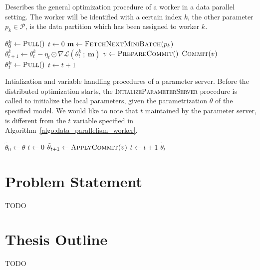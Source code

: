 \begin{algorithm}[H]
  \caption{Describes the general optimization procedure of a worker in a data parallel setting. The worker will be identified with a certain index $k$, the other parameter $p_k \in \mathcal{P}$, is the data partition which has been assigned to worker $k$.}
  \label{algo:data_parallelism_worker}
  \begin{algorithmic}[1]
    \State $\theta^k_0 \gets \Call{Pull}{ }$
    \State $t \gets 0$
    \State $\textbf{m} \gets \Call{FetchNextMiniBatch}{p_k}$
    \State $\theta^k_{t + 1} \gets \theta^k_t - \eta_t \odot \nabla \mathcal{L}(\theta^k_t~;~\textbf{m})$ 
    \State $v \gets \Call{PrepareCommit}{ }$
    \State $\Call{Commit}{v}$
    \State $\theta^k_t \gets \Call{Pull}{ }$
    \State $t \gets t + 1$
    \EndWhile
    \EndProcedure
  \end{algorithmic}
\end{algorithm}

\begin{algorithm}[H]
  \caption{Intialization and variable handling procedures of a parameter server. Before the distributed optimization starts, the \textsc{IntializeParameterServer} procedure is called to initialize the local parameters, given the parametrization $\theta$ of the specified model. We would like to note that $t$ maintained by the parameter server, is different from the $t$ variable specified in Algorithm~\ref{algo:data_parallelism_worker}.}
  \label{algo:data_parallelism_parameter_server}
  \begin{algorithmic}[1]
    \State $\tilde{\theta}_0 \gets \theta$
    \State $t \gets 0$
    \EndProcedure
    \State
    \State $\tilde{\theta}_{t + 1} \gets \Call{ApplyCommit}{v}$
    \State $t \gets t + 1$
    \EndProcedure
    \State
    \State \Return $\tilde{\theta}_t$
    \EndProcedure
  \end{algorithmic}
\end{algorithm}

\section{Problem Statement}
\label{sec:problem_statement}

TODO

\section{Thesis Outline}
\label{sec:thesis_outline}

TODO
